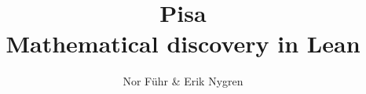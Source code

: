 \documentclass[presentation]{beamer}
\author{Nor Führ \& Erik Nygren}
\title{\Huge{Pisa} \\ \Large{Mathematical discovery in Lean}}
\begin{document}
\frame{\titlepage}

\end{document}
